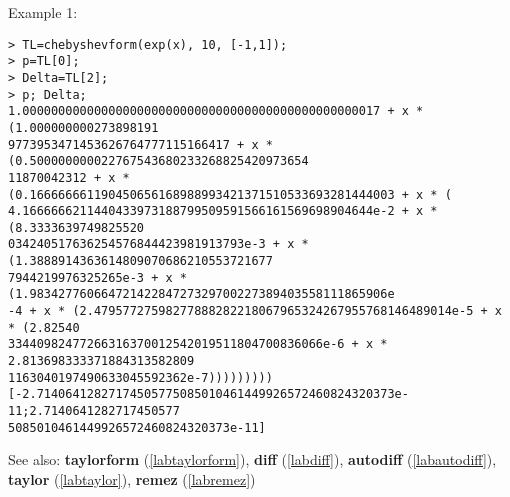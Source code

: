 \noindent Example 1: 
\begin{center}\begin{minipage}{15cm}\begin{Verbatim}[frame=single,commandchars=\\\|\~]
> TL=chebyshevform(exp(x), 10, [-1,1]);
> p=TL[0];
> Delta=TL[2];
> p; Delta;
1.00000000000000000000000000000000000000000000000017 + x * (1.000000000273898191
9773953471453626764777115166417 + x * (0.500000000022767543680233268825420973654
11870042312 + x * (0.166666661190450656168988993421371510533693281444003 + x * (
4.1666666211440433973188799509591566161569698904644e-2 + x * (8.3333639749825520
034240517636254576844423981913793e-3 + x * (1.3888914363614809070686210553721677
7944219976325265e-3 + x * (1.98342776066472142284727329700227389403558111865906e
-4 + x * (2.47957727598277888282218067965324267955768146489014e-5 + x * (2.82540
33440982477266316370012542019511804700836066e-6 + x * 2.813698333371884313582809
1163040197490633045592362e-7)))))))))
[-2.71406412827174505775085010461449926572460824320373e-11;2.7140641282717450577
5085010461449926572460824320373e-11]
\end{Verbatim}
\end{minipage}\end{center}
See also: \textbf{taylorform} (\ref{labtaylorform}), \textbf{diff} (\ref{labdiff}), \textbf{autodiff} (\ref{labautodiff}), \textbf{taylor} (\ref{labtaylor}), \textbf{remez} (\ref{labremez})
